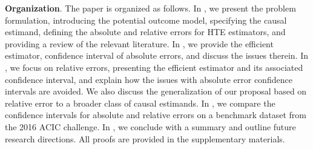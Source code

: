\documentclass{article}
\newcommand{\zg}[1]{{\color{blue} [ZG: #1]}}
\theoremstyle{plain}
\theoremstyle{definition}
\theoremstyle{plain}
\begin{document}

\noindent\textbf{Organization}.
The paper is organized as follows. 
In , we present the problem formulation, introducing the potential outcome model, specifying the causal estimand, defining the absolute and relative errors for HTE estimators, and providing a review of the relevant literature. In , we provide the efficient estimator, confidence interval of absolute errors, and discuss the issues therein.
In , we focus on relative errors, presenting the efficient estimator and its associated confidence interval, and explain how the issues with absolute error confidence intervals are avoided.
We also discuss the generalization of our proposal based on relative error to a broader class of causal estimands. 
In , we compare the confidence intervals for absolute and relative errors on a benchmark dataset from the 2016 ACIC challenge. 
In , we conclude with a summary and outline future research directions. 
All proofs are provided in the supplementary materials.

\end{document}
